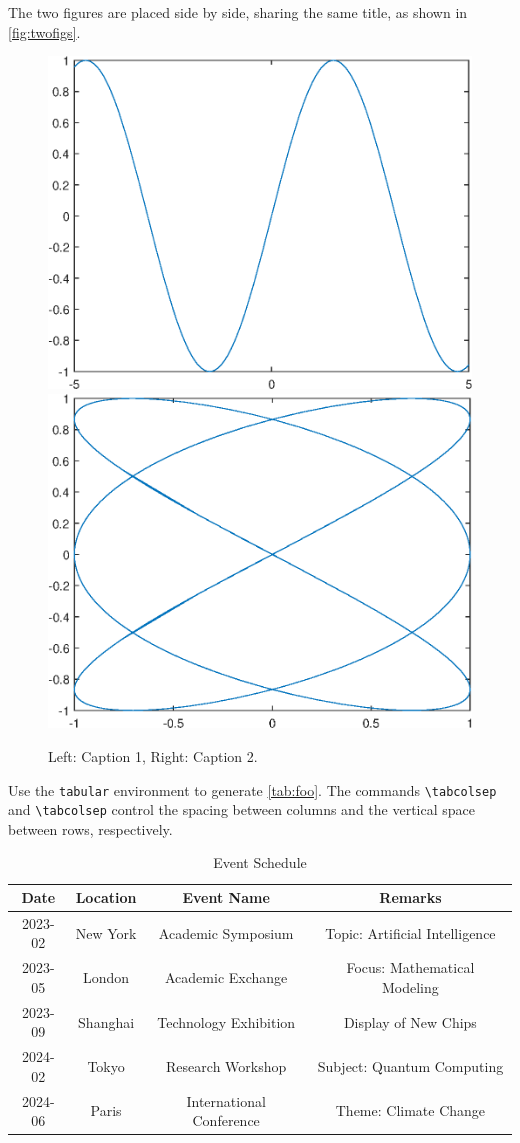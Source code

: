 \documentclass{article}
\theoremstyle{plain}
\theoremstyle{definition}
\theoremstyle{remark}
\numberwithin{equation}{section}
\numberwithin{figure}{section}
\numberwithin{table}{section}
\begin{document}
The two figures are placed side by side, sharing the same title, as shown in \autoref{fig:twofigs}.
\begin{figure}[htp!]
  \centering
  \includegraphics[width=0.45\linewidth]{image1}
  \qquad
  \includegraphics[width=0.45\linewidth]{image2}
  \caption{Left: Caption 1, Right: Caption 2.}
  \label{fig:twofigs}
\end{figure}

\clearpage
Use the \texttt{tabular} environment to generate \autoref{tab:foo}.
The commands \verb|\tabcolsep| and \verb|\tabcolsep| control the spacing between columns and the vertical space between rows, respectively.

\begin{table}[htp!]
\small
\centering
\setlength{\tabcolsep}{12pt}  %
\renewcommand{\arraystretch}{1.2}
\caption{Event Schedule}
\label{tab:foo}
\begin{tabular}{|c|c|c|c|}
\hline
\textbf{Date} & \textbf{Location}  & \textbf{Event Name}  & \textbf{Remarks}  \\ \hline
2023-02  & New York & Academic Symposium     & Topic: Artificial Intelligence \\ \hline
2023-05  & London   & Academic Exchange      & Focus: Mathematical Modeling   \\ \hline
2023-09  & Shanghai & Technology Exhibition  & Display of New Chips           \\ \hline
2024-02  & Tokyo   & Research Workshop      & Subject: Quantum Computing     \\ \hline
2024-06  & Paris   & International Conference & Theme: Climate Change        \\ \hline
\end{tabular}
\end{table}
\end{document}
